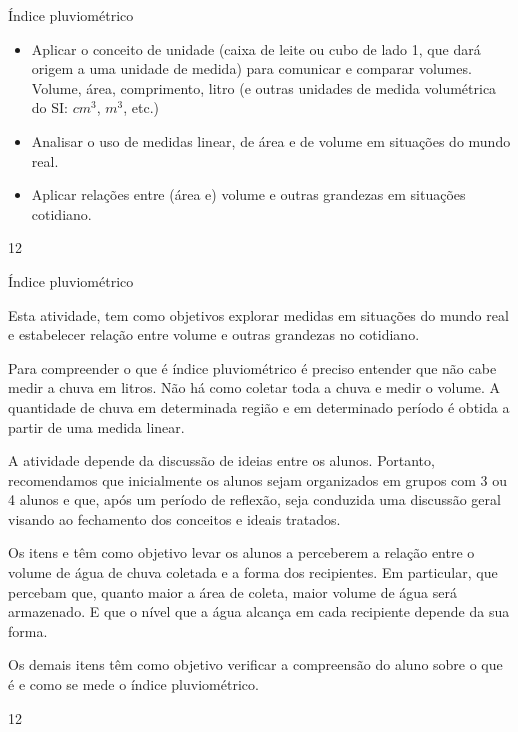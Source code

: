 \clearmargin
\begin{objectives}{Índice pluviométrico}
{
\begin{itemize}
\item {} 
Aplicar o conceito de unidade (caixa de leite ou cubo de lado 1, que dará origem a uma unidade de medida) para comunicar e comparar volumes. Volume, área, comprimento, litro (e outras unidades de medida volumétrica do SI: \(cm^3\), \(m^3\), etc.)

\item {} 
Analisar o uso de medidas linear, de área e de volume em situações do mundo real.

\item {} 
Aplicar relações entre (área e) volume e outras grandezas em situações cotidiano.

\end{itemize}
}{1}{2}
\end{objectives}
\begin{sugestions}{Índice pluviométrico}
{
Esta atividade, tem como objetivos explorar medidas em situações do mundo real e estabelecer relação entre volume e outras grandezas no cotidiano.

Para compreender o que é índice pluviométrico é preciso entender que não cabe medir a chuva em litros. Não há como coletar toda a chuva e medir o volume. A quantidade de chuva em determinada região e em determinado período é obtida a partir de uma medida linear.

A atividade depende da discussão de ideias entre os alunos. Portanto, recomendamos que inicialmente os alunos sejam organizados em grupos com 3 ou 4 alunos e que, após um período de reflexão, seja conduzida uma discussão geral visando ao fechamento dos conceitos e ideais tratados.

Os itens  e  têm como objetivo levar os alunos a perceberem a relação entre o volume de água de chuva coletada e a forma dos recipientes. Em particular, que percebam que, quanto maior a área de coleta, maior volume de água será armazenado. E que o nível que a água alcança em cada recipiente depende da sua forma.

Os demais itens têm como objetivo verificar a compreensão do aluno sobre o que é e como se mede o índice pluviométrico.
}{1}{2}
\end{sugestions}
\clearmargin
